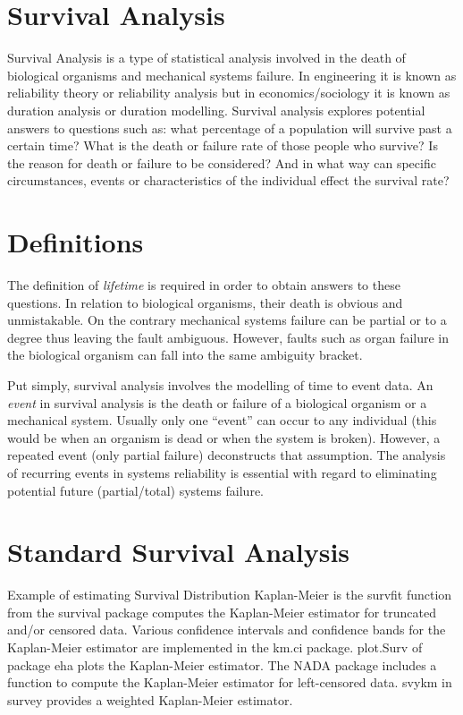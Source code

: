 \documentclass[11pt]{article} %
\begin{document}
\section{Survival Analysis}
Survival Analysis is a type of statistical analysis involved in the death of biological organisms and mechanical systems failure. In engineering it is known as reliability theory or reliability analysis but in economics/sociology it is known as duration analysis or duration modelling. Survival analysis explores potential answers to questions such as: what percentage of a population will survive past a certain time? What is the death or failure rate of those people who survive? Is the reason for death or failure to be considered? And in what way can specific circumstances, events or characteristics of the individual effect the survival rate?

\section{Definitions}
The definition of \textit{lifetime} is required in order to obtain answers to these questions. In relation to biological organisms, their death is obvious and unmistakable. On the contrary mechanical systems failure can be partial or to a degree thus leaving the fault ambiguous. However, faults such as organ failure in the biological organism can fall into the same ambiguity bracket. 

Put simply, survival analysis involves the modelling of time to event data. An \textit{event} in survival analysis is the death or failure of a biological organism or a mechanical system. Usually only one “event” can occur to any individual (this would be when an organism is dead or when the system is broken). However, a repeated event (only partial failure) deconstructs that assumption. The analysis of recurring events in systems reliability is essential with regard to eliminating potential future (partial/total) systems failure.
\section{Standard Survival Analysis}
Example of estimating Survival Distribution
Kaplan-Meier is the survfit function from the survival package computes the Kaplan-Meier estimator for truncated and/or censored data. Various confidence intervals and confidence bands for the Kaplan-Meier estimator are implemented in the km.ci package. plot.Surv of package eha plots the Kaplan-Meier estimator. The NADA package includes a function to compute the Kaplan-Meier estimator for left-censored data. svykm in survey provides a weighted Kaplan-Meier estimator. 
\end{document}

